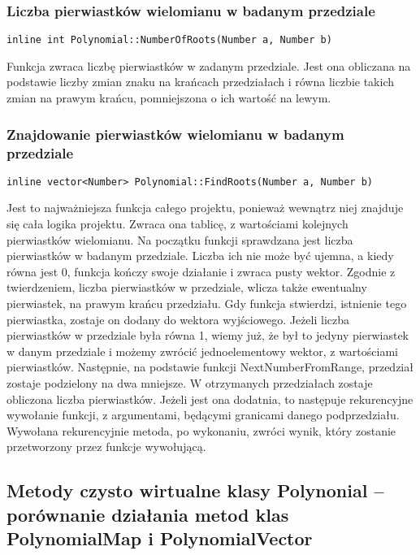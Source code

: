 \documentclass[twoside,a4paper]{book}
\begin{document}
\subsubsection{Liczba pierwiastków wielomianu w badanym przedziale}
\begin{lstlisting}
inline int Polynomial::NumberOfRoots(Number a, Number b)
\end{lstlisting}

Funkcja zwraca liczbę pierwiastków w zadanym przedziale. Jest ona obliczana na podstawie liczby zmian znaku na krańcach przedziałach i równa liczbie takich zmian na prawym krańcu, pomniejszona o ich wartość na lewym.
\\

\subsubsection{Znajdowanie pierwiastków wielomianu w badanym przedziale}
\begin{lstlisting}
inline vector<Number> Polynomial::FindRoots(Number a, Number b)
\end{lstlisting}

Jest to najważniejsza funkcja całego projektu, ponieważ wewnątrz niej znajduje się cała logika projektu. Zwraca ona tablicę, z wartościami kolejnych pierwiastków wielomianu. Na początku funkcji sprawdzana jest liczba pierwiastków w badanym przedziale. Liczba ich nie może być ujemna, a kiedy równa jest 0, funkcja kończy swoje działanie i zwraca pusty wektor.
Zgodnie z twierdzeniem, liczba pierwiastków w przedziale, wlicza także ewentualny pierwiastek, na prawym krańcu przedziału. Gdy funkcja stwierdzi, istnienie tego pierwiastka, zostaje on dodany do wektora wyjściowego. Jeżeli liczba pierwiastków w przedziale była równa 1, wiemy już, że był to jedyny pierwiastek w danym przedziale i możemy zwrócić jednoelementowy wektor, z wartościami pierwiastków.
Następnie, na podstawie funkcji NextNumberFromRange, przedział zostaje podzielony na dwa mniejsze. W otrzymanych przedziałach zostaje obliczona liczba pierwiastków. Jeżeli jest ona dodatnia, to następuje rekurencyjne wywołanie funkcji, z argumentami, będącymi granicami danego podprzedziału. Wywołana rekurencyjnie metoda, po wykonaniu, zwróci wynik, który zostanie przetworzony przez funkcje wywołującą. 
\\

\subsection{Metody czysto wirtualne klasy Polynonial – porównanie działania metod klas PolynomialMap i PolynomialVector}
\end{document}
